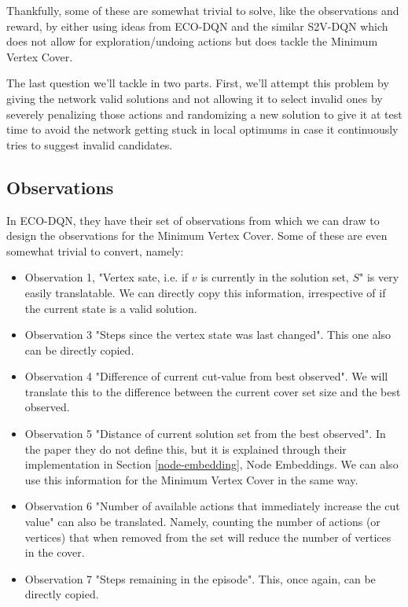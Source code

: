 \documentclass{article}
\begin{document}
Thankfully, some of these are somewhat trivial to solve, like the observations and reward, by either using ideas from ECO-DQN \cite{eco-dqn} and the similar S2V-DQN \cite{s2v-dqn} which does not allow for exploration/undoing actions but does tackle the Minimum Vertex Cover.

The last question we'll tackle in two parts. First, we'll attempt this problem by giving the network valid solutions and not allowing it to select invalid ones by severely penalizing those actions and randomizing a new solution to give it at test time to avoid the network getting stuck in local optimums in case it continuously tries to suggest invalid candidates.

\subsection{Observations}

In ECO-DQN, they have their set of observations from which we can draw to design the observations for the Minimum Vertex Cover. Some of these are even somewhat trivial to convert, namely:

\begin{itemize}
    \item Observation 1, "Vertex sate, i.e. if $v$ is currently in the solution set, $S$" is very easily translatable. We can directly copy this information, irrespective of if the current state is a valid solution.
    \item Observation 3 "Steps since the vertex state was last changed". This one also can be directly copied.
    \item Observation 4 "Difference of current cut-value from best observed". We will translate this to the difference between the current cover set size and the best observed.
    \item Observation 5 "Distance of current solution set from the best observed". In the paper they do not define this, but it is explained through their implementation in Section \ref{node-embedding}, Node Embeddings. We can also use this information for the Minimum Vertex Cover in the same way.
    \item Observation 6 "Number of available actions that immediately increase the cut value" can also be translated. Namely, counting the number of actions (or vertices) that when removed from the set will reduce the number of vertices in the cover. 
    \item Observation 7 "Steps remaining in the episode". This, once again, can be directly copied.
\end{itemize}
\end{document}
